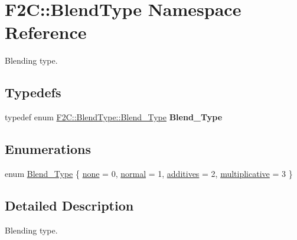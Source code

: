 \hypertarget{namespace_f2_c_1_1_blend_type}{
\section{F2C::BlendType Namespace Reference}
\label{namespace_f2_c_1_1_blend_type}
}


Blending type.  


\subsection*{Typedefs}
\begin{DoxyCompactItemize}
\item 
\hypertarget{namespace_f2_c_1_1_blend_type_a865adca60dbb5216b80a2bcd94e7b449}{
typedef enum \hyperlink{namespace_f2_c_1_1_blend_type_a582fe2d83fb813041785794568e5a414}{F2C::BlendType::Blend\_\-Type} {\bfseries Blend\_\-Type}}
\label{namespace_f2_c_1_1_blend_type_a865adca60dbb5216b80a2bcd94e7b449}

\end{DoxyCompactItemize}
\subsection*{Enumerations}
\begin{DoxyCompactItemize}
\item 
enum \hyperlink{namespace_f2_c_1_1_blend_type_a582fe2d83fb813041785794568e5a414}{Blend\_\-Type} \{ \hyperlink{namespace_f2_c_1_1_blend_type_a582fe2d83fb813041785794568e5a414a4ebdda04e8a794154e3df41625fbe3d0}{none} =  0, 
\hyperlink{namespace_f2_c_1_1_blend_type_a582fe2d83fb813041785794568e5a414a2084064e21b9f53a30773e369548d025}{normal} =  1, 
\hyperlink{namespace_f2_c_1_1_blend_type_a582fe2d83fb813041785794568e5a414a9acf5136aaba5039673f8ca4b1146b87}{additives} =  2, 
\hyperlink{namespace_f2_c_1_1_blend_type_a582fe2d83fb813041785794568e5a414aa80eb477f2ae8eedf00b1a7b50f8c1c8}{multiplicative} =  3
 \}
\end{DoxyCompactItemize}


\subsection{Detailed Description}
Blending type. 

